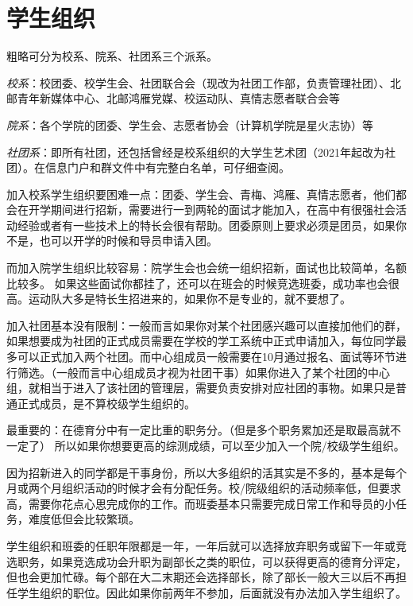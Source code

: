 \section{学生组织}


粗略可分为校系、院系、社团系三个派系。

\emph{校系}：校团委、校学生会、社团联合会（现改为社团工作部，负责管理社团）、北邮青年新媒体中心、北邮鸿雁党媒、校运动队、真情志愿者联合会等

\emph{院系}：各个学院的团委、学生会、志愿者协会（计算机学院是星火志协）等

\emph{社团系}：即所有社团，还包括曾经是校系组织的大学生艺术团（2021年起改为社团）。在信息门户和群文件中有完整白名单，可仔细查阅。

加入校系学生组织要困难一点：团委、学生会、青梅、鸿雁、真情志愿者，他们都会在开学期间进行招新，需要进行一到两轮的面试才能加入，在高中有很强社会活动经验或者有一些技术上的特长会很有帮助。团委原则上要求必须是团员，如果你不是，也可以开学的时候和导员申请入团。

而加入院学生组织比较容易：院学生会也会统一组织招新，面试也比较简单，名额比较多。
如果这些面试你都挂了，还可以在班会的时候竞选班委，成功率也会很高。运动队大多是特长生招进来的，如果你不是专业的，就不要想了。

加入社团基本没有限制：一般而言如果你对某个社团感兴趣可以直接加他们的群，如果想要成为社团的正式成员需要在学校的学工系统中正式申请加入，每位同学最多可以正式加入两个社团。而中心组成员一般需要在10月通过报名、面试等环节进行筛选。（一般而言中心组成员才视为社团干事）如果你进入了某个社团的中心组，就相当于进入了该社团的管理层，需要负责安排对应社团的事物。如果只是普通正式成员，是不算校级学生组织的。


最重要的：在德育分中有一定比重的职务分。（但是多个职务累加还是取最高就不一定了）
所以如果你想要更高的综测成绩，可以至少加入一个院/校级学生组织。

因为招新进入的同学都是干事身份，所以大多组织的活其实是不多的，基本是每个月或两个月组织活动的时候才会有分配任务。校/院级组织的活动频率低，但要求高，需要你花点心思完成你的工作。而班委基本只需要完成日常工作和导员的小任务，难度低但会比较繁琐。

学生组织和班委的任职年限都是一年，一年后就可以选择放弃职务或留下一年或竞选职务，如果竞选成功会升职为副部长之类的职位，可以获得更高的德育分评定，但也会更加忙碌。每个部在大二末期还会选择部长，除了部长一般大三以后不再担任学生组织的职位。因此如果你前两年不参加，后面就没有办法加入学生组织了。

